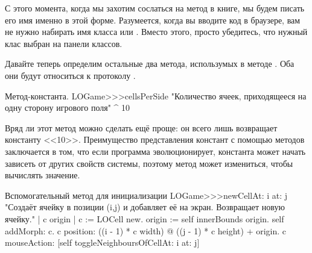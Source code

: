 \documentclass[a4paper,10pt,twoside]{book}
\begin{document}
{%
С этого момента, когда мы захотим сослаться на метод в книге, мы будем писать его имя именно в этой форме. Разумеется, когда вы вводите код в браузере, вам не нужно набирать имя класса или \ct{>>>}. Вместо этого, просто убедитесь, что нужный клас выбран на панели классов.

Давайте теперь определим остальные два метода, использумых в методе . Оба они будут относиться к протоколу .

\begin{method}[sbegamecellsperside]{Метод-константа.}
LOGame>>>cellsPerSide
   "Количество ячеек, приходящееся на одну сторону игрового поля"
   ^ 10
\end{method}

Вряд ли этот метод можно сделать ещё проще: он всего лишь возвращает константу <<10>>. Преимущество представления констант с помощью методов заключается в том, что если программа эволюционирует, константа может начать зависеть от других свойств системы, поэтому метод может измениться, чтобы вычислять значение.

\begin{method}[newCellAt:at:]{Вспомогательный метод для инициализации}
LOGame>>>newCellAt: i at: j
   "Создаёт ячейку в позиции (i,j) и добавляет её на экран. Возвращает новую ячейку."
   | c origin |
   c := LOCell new.
   origin := self innerBounds origin.
   self addMorph: c.
   c position: ((i - 1) * c width) @ ((j - 1) * c height) + origin.
   c mouseAction: [self toggleNeighboursOfCellAt: i at: j]
\end{method}

}
\end{document}
